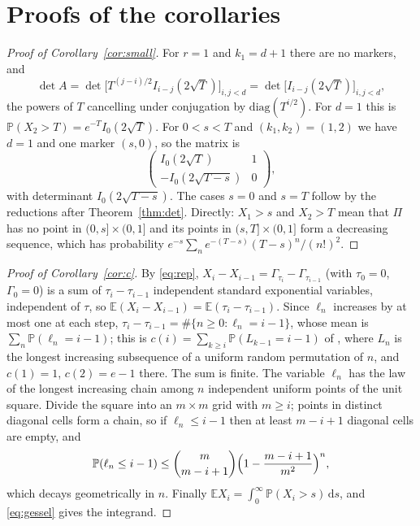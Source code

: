\documentclass[11pt]{amsart}
\theoremstyle{remark}
\numberwithin{equation}{section}
\newcommand{\E}{\mathbb E}
\newcommand{\Pp}{\mathbb P}
\newcommand{\dd}{\,\mathrm d}
\begin{document}
\section{Proofs of the corollaries}\label{sec:cor}

\begin{proof}[Proof of Corollary~\ref{cor:small}]
For $r=1$ and $k_1=d+1$ there are no markers, and
\[
\det A=\det\bigl[T^{(j-i)/2}I_{i-j}(2\sqrt T)\bigr]_{i,j<d}=\det\bigl[I_{i-j}(2\sqrt T)\bigr]_{i,j<d},
\]
the powers of $T$ cancelling under conjugation by $\mathrm{diag}(T^{i/2})$. For $d=1$ this is $\Pp(X_2>T)=e^{-T}I_0(2\sqrt T)$. For $0<s<T$ and $(k_1,k_2)=(1,2)$ we have $d=1$ and one marker $(s,0)$, so the matrix is
\[
\begin{pmatrix}I_0(2\sqrt T)&1\\-I_0(2\sqrt{T-s})&0\end{pmatrix},
\]
with determinant $I_0(2\sqrt{T-s})$. The cases $s=0$ and $s=T$ follow by the reductions after Theorem~\ref{thm:det}. Directly: $X_1>s$ and $X_2>T$ mean that $\Pi$ has no point in $(0,s]\times(0,1]$ and its points in $(s,T]\times(0,1]$ form a decreasing sequence, which has probability $e^{-s}\sum_n e^{-(T-s)}(T-s)^n/(n!)^2$.
\end{proof}

\begin{proof}[Proof of Corollary~\ref{cor:c}]
By \eqref{eq:rep}, $X_i-X_{i-1}=\Gamma_{\tau_i}-\Gamma_{\tau_{i-1}}$ (with $\tau_0=0$, $\Gamma_0=0$) is a sum of $\tau_i-\tau_{i-1}$ independent standard exponential variables, independent of $\tau$, so $\E(X_i-X_{i-1})=\E(\tau_i-\tau_{i-1})$. Since $\ell_n$ increases by at most one at each step, $\tau_i-\tau_{i-1}=\#\{n\ge0:\ell_n=i-1\}$, whose mean is $\sum_n\Pp(\ell_n=i-1)$; this is $c(i)=\sum_{k\ge i}\Pp(L_{k-1}=i-1)$ of \cite[Proposition~9]{AD99}, where $L_n$ is the longest increasing subsequence of a uniform random permutation of $n$, and $c(1)=1$, $c(2)=e-1$ there. The sum is finite. The variable $\ell_n$ has the law of the longest increasing chain among $n$ independent uniform points of the unit square. Divide the square into an $m\times m$ grid with $m\ge i$; points in distinct diagonal cells form a chain, so if $\ell_n\le i-1$ then at least $m-i+1$ diagonal cells are empty, and
\[
\Pp(\ell_n\le i-1)\le\binom{m}{m-i+1}\Bigl(1-\frac{m-i+1}{m^2}\Bigr)^n,
\]
which decays geometrically in $n$. Finally $\E X_i=\int_0^\infty\Pp(X_i>s)\dd s$, and \eqref{eq:gessel} gives the integrand.
\end{proof}
\end{document}
